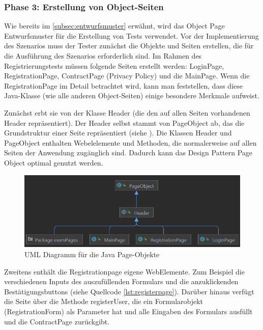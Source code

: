 \subsubsection{Phase 3: Erstellung von Object-Seiten}

Wie bereits im \autoref{subsec:entwurfsmuster} erwähnt, wird das Object
Page Entwurfsmuster für die Erstellung von Tests verwendet.
Vor der Implementierung des Szenarios muss der Tester zunächst
die Objekte und Seiten erstellen, die für die Ausführung des Szenarios
erforderlich sind. Im Rahmen des Registrierungstests müssen folgende
Seiten erstellt werden: LoginPage, RegistrationPage, ContractPage
(Privacy Policy) und die MainPage. Wenn die RegistrationPage
im Detail betrachtet wird, kann man feststellen, dass diese
Java-Klasse (wie alle anderen Object-Seiten) einige besondere Merkmale
aufweist.

Zunächst erbt sie von der Klasse Header (die den auf allen Seiten
vorhandenen Header repräsentiert). Der Header selbst stammt von
PageObject ab, das die Grundstruktur einer Seite repräsentiert
(siehe ). Die Klassen Header und PageObject enthalten
Webelelemente und Methoden, die normalerweise auf allen Seiten der
Anwendung zugänglich sind. Dadurch kann das Design Pattern Page
Object optimal genutzt werden.

\begin{figure}[H]
    \centering
    \includegraphics[scale=0.7]{images/pag-uml}
    \caption{UML Diagramm für die Java Page-Objekte} \label{fig:pag-uml}
\end{figure}

Zweitens enthält die Registrationpage eigene WebElemente.
Zum Beispiel die verschiedenen Inputs des auszufüllenden Formulars und
die anzuklickenden Bestätigungsbuttons (siehe Quellcode \ref{lst:registerpage}). Darüber hinaus
verfügt die Seite über die Methode registerUser, die ein
Formularobjekt (RegistrationForm) als Parameter hat und alle Eingaben
des Formulars ausfüllt und die ContractPage zurückgibt.

